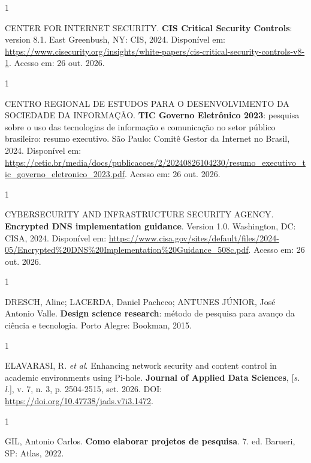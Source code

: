 \documentclass[12pt,a4paper]{article}
\begin{document}
\begin{spacing}{1}\raggedright\noindent CENTER FOR INTERNET SECURITY. \textbf{CIS Critical Security Controls}: version 8.1. East Greenbush, NY: CIS, 2024. Disponível em: \url{https://www.cisecurity.org/insights/white-papers/cis-critical-security-controls-v8-1}. Acesso em: 26 out. 2026.\par\vspace{12pt}\end{spacing}
\begin{spacing}{1}\raggedright\noindent CENTRO REGIONAL DE ESTUDOS PARA O DESENVOLVIMENTO DA SOCIEDADE DA INFORMAÇÃO. \textbf{TIC Governo Eletrônico 2023}: pesquisa sobre o uso das tecnologias de informação e comunicação no setor público brasileiro: resumo executivo. São Paulo: Comitê Gestor da Internet no Brasil, 2024. Disponível em: \url{https://cetic.br/media/docs/publicacoes/2/20240826104230/resumo_executivo_tic_governo_eletronico_2023.pdf}. Acesso em: 26 out. 2026.\par\vspace{12pt}\end{spacing}
\begin{spacing}{1}\raggedright\noindent CYBERSECURITY AND INFRASTRUCTURE SECURITY AGENCY. \textbf{Encrypted DNS implementation guidance}. Version 1.0. Washington, DC: CISA, 2024. Disponível em: \url{https://www.cisa.gov/sites/default/files/2024-05/Encrypted%20DNS%20Implementation%20Guidance_508c.pdf}. Acesso em: 26 out. 2026.\par\vspace{12pt}\end{spacing}
\begin{spacing}{1}\raggedright\noindent DRESCH, Aline; LACERDA, Daniel Pacheco; ANTUNES JÚNIOR, José Antonio Valle. \textbf{Design science research}: método de pesquisa para avanço da ciência e tecnologia. Porto Alegre: Bookman, 2015.\par\vspace{12pt}\end{spacing}
\begin{spacing}{1}\raggedright\noindent ELAVARASI, R. \textit{et al}. Enhancing network security and content control in academic environments using Pi-hole. \textbf{Journal of Applied Data Sciences}, [\textit{s. l.}], v. 7, n. 3, p. 2504-2515, set. 2026. DOI: \url{https://doi.org/10.47738/jads.v7i3.1472}.\par\vspace{12pt}\end{spacing}
\begin{spacing}{1}\raggedright\noindent GIL, Antonio Carlos. \textbf{Como elaborar projetos de pesquisa}. 7. ed. Barueri, SP: Atlas, 2022.\par\vspace{12pt}\end{spacing}
\end{document}
